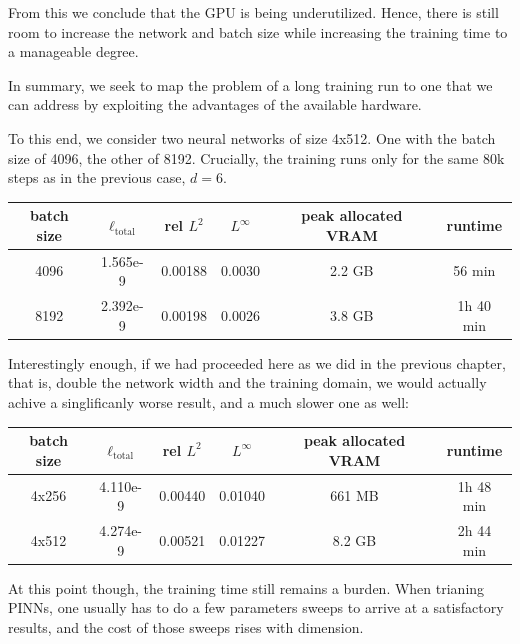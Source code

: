 From this we conclude that the GPU is being underutilized.
Hence, there is still room to increase the network and batch size
while increasing the training time to a manageable degree.

In summary, 
we seek to map the problem of a long training run to one that we can address
by exploiting the advantages of the available hardware.

To this end, we consider two neural networks of size 4x512.
One with the batch size of 4096, the other of 8192.
Crucially, the training runs only for the same 80k steps as in the previous case, $d=6$.

\begin{center}
\begin{tabular}{ |c|c|c|c|c|c| } 
\hline
batch size & $\ell_{\mathrm{total}}$ & rel $L^2$ & $L^\infty$ & peak allocated VRAM & runtime\\
\hline
4096 & 1.565e-9 & 0.00188 & 0.0030 & 2.2 GB & 56 min\\
\hline
8192 & 2.392e-9 & 0.00198 & 0.0026 & 3.8 GB & 1h 40 min\\
\hline
\end{tabular}
\end{center}

Interestingly enough, if we had proceeded here as we did in the previous chapter, that is,
double the network width and the training domain, we would actually achive a singlificanly worse result, and a much slower one as well:
\begin{center}
\begin{tabular}{ |c|c|c|c|c|c| } 
\hline
batch size & $\ell_{\mathrm{total}}$ & rel $L^2$ & $L^\infty$ & peak allocated VRAM & runtime\\
\hline
4x256 & 4.110e-9 & 0.00440 & 0.01040 & 661 MB & 1h 48 min\\
\hline
4x512 & 4.274e-9 & 0.00521 & 0.01227 & 8.2 GB & 2h 44 min\\
\hline
\end{tabular}
\end{center}


At this point though, the training time still remains a burden.
When trianing PINNs, one usually has to do a few parameters sweeps to arrive at a satisfactory results,
and the cost of those sweeps rises with dimension.

%
%
%


